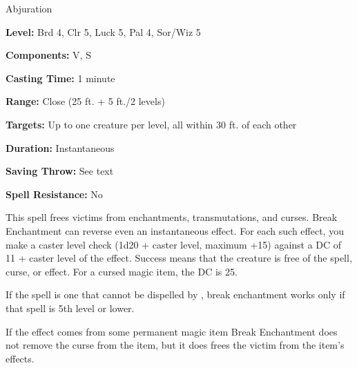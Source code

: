 
Abjuration

\textbf{Level:} Brd 4, Clr 5, Luck 5, Pal 4, Sor/Wiz 5

\textbf{Components:} V, S

\textbf{Casting Time:} 1 minute

\textbf{Range:} Close (25 ft. + 5 ft./2 levels)

\textbf{Targets:} Up to one creature per level, all within 30 ft. of each other

\textbf{Duration:} Instantaneous

\textbf{Saving Throw:} See text

\textbf{Spell Resistance:} No

This spell frees victims from enchantments, transmutations, and curses. Break 
Enchantment can reverse even an instantaneous effect. For each such effect, you 
make a caster level check (1d20 + caster level, maximum +15) against a DC of 11 
+ caster level of the effect. Success means that the creature is free of the spell, 
curse, or effect. For a cursed magic item, the DC is 25.

If the spell is one that cannot be dispelled by , break 
enchantment works only if that spell is 5th level or lower. 

If the effect comes from some permanent magic item Break Enchantment does 
not remove the curse from the item, but it does frees the victim from the item's 
effects. 

